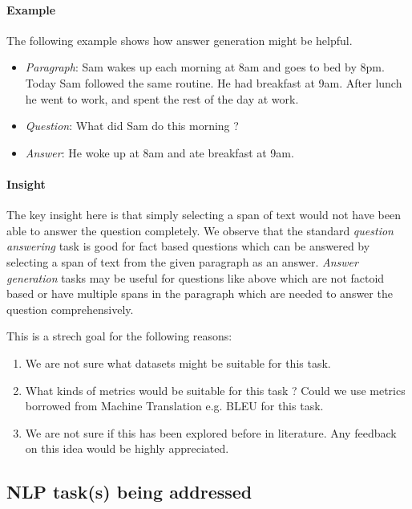 \paragraph{Example} The following example shows how answer generation might be helpful.

	\begin{itemize}
	\item \textit{Paragraph}:  Sam wakes up each morning at 8am and goes to bed by 8pm.  Today Sam followed the same routine. He had breakfast at 9am. After lunch he went to work, and spent the rest of the day at work.
	\item \textit{Question}: What did Sam do this morning ?
	\item \textit{Answer}: He woke up at 8am and ate breakfast at 9am.
	\end{itemize}

\paragraph{Insight} The key insight here is that simply selecting a span of text would not have been able to answer the question completely. We observe that the standard \textit{question answering} task is good for fact based questions which can be answered by selecting a span of text from the given paragraph as an answer. \textit{Answer generation} tasks may be useful for questions like above which are not factoid based or have multiple spans in the paragraph which are needed to answer the question comprehensively.

This is a strech goal for the following reasons:
	
	\begin{enumerate}
	\item We are not sure what datasets might be suitable for this task. 
	\item What kinds of metrics would be suitable for this task ? Could we use metrics borrowed from Machine Translation e.g. BLEU for this task.
	\item We are not sure if this has been explored before in literature. Any feedback on this idea would be highly appreciated.
	\end{enumerate}
	

\subsection{NLP task(s) being addressed}
\label{subsec:projecttasks}


